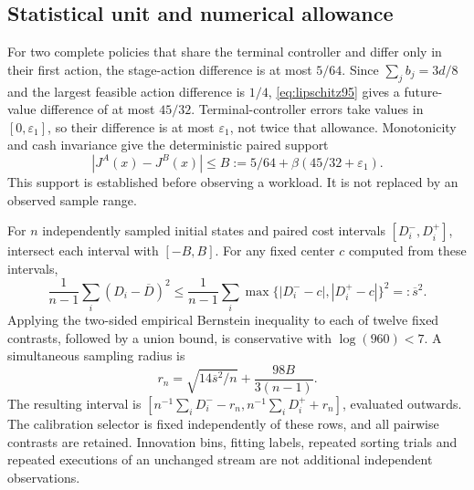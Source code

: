 \subsection{Statistical unit and numerical allowance}
For two complete policies that share the terminal controller and differ only in their first action, the stage-action difference is at most $5/64$. Since $\sum_j b_j=3d/8$ and the largest feasible action difference is $1/4$, \eqref{eq:lipschitz95} gives a future-value difference of at most $45/32$. Terminal-controller errors take values in $[0,\varepsilon_1]$, so their difference is at most $\varepsilon_1$, not twice that allowance. Monotonicity and cash invariance give the deterministic paired support
\[
 |J^A(x)-J^B(x)|\leq B:=5/64+\beta(45/32+\varepsilon_1).
\]
This support is established before observing a workload. It is not replaced by an observed sample range.

For $n$ independently sampled initial states and paired cost intervals $[D_i^-,D_i^+]$, intersect each interval with $[-B,B]$. For any fixed center $c$ computed from these intervals,
\[
 \frac1{n-1}\sum_i(D_i-\overline D)^2
 \leq\frac1{n-1}\sum_i\max\{|D_i^--c|,|D_i^+-c|\}^2=:\overline s^2.
\]
Applying the two-sided empirical Bernstein inequality \citep{maurer2009} to each of twelve fixed contrasts, followed by a union bound, is conservative with $\log(960)<7$. A simultaneous sampling radius is
\[
 r_n=\sqrt{14\overline s^2/n}+\frac{98B}{3(n-1)}.
\]
The resulting interval is $[n^{-1}\sum_iD_i^- -r_n,n^{-1}\sum_iD_i^+ +r_n]$, evaluated outwards. The calibration selector is fixed independently of these rows, and all pairwise contrasts are retained. Innovation bins, fitting labels, repeated sorting trials and repeated executions of an unchanged stream are not additional independent observations.

